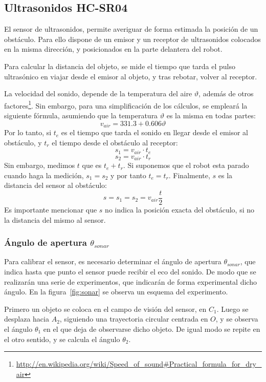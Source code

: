 \documentclass[10pt,a4paper,hidelinks]{article}
\begin{document}
\begin{multicols}{2}
\subsection{Ultrasonidos HC-SR04}

El sensor de ultrasonidos, permite averiguar de forma estimada la posición de un obstáculo. Para ello dispone de un emisor y un receptor de ultrasonidos colocados en la misma dirección, y posicionados en la parte delantera del robot.

Para calcular la distancia del objeto, se mide el tiempo que tarda el pulso ultrasónico en viajar desde el emisor al objeto, y tras rebotar, volver al receptor.

La velocidad del sonido, depende de la temperatura del aire $\vartheta$, además
de otros
factores\footnote{\url{http://en.wikipedia.org/wiki/Speed\_of\_sound\#Practical\_formula\_for\_dry\_air}}.
Sin embargo, para una simplificación de los cálculos, se empleará la siguiente
fórmula, asumiendo que la temperatura $\vartheta$ es la misma en todas partes:
$$ v_{air} = 331.3 + 0.606\vartheta $$
Por lo tanto, si $t_e$ es el tiempo que tarda el sonido en llegar desde el emisor al obstáculo, y $t_r$ el tiempo desde el obstáculo al receptor:
$$ s_1 = v_{air} \cdot t_e $$
$$ s_2 = v_{air} \cdot t_r $$
Sin embargo, medimos $t$ que es $t_e+t_r$. Si suponemos que el robot esta parado cuando haga la medición, $s_1 = s_2$ y por tanto $t_e = t_r$. Finalmente, $s$ es la distancia del sensor al obstáculo:
\begin{equation}
	s = s_1 = s_2 = v_{air}\frac{t}{2}\label{eq:air}
\end{equation}
Es importante mencionar que $s$ no indica la posición exacta del obstáculo, si 
no la distancia del mismo al sensor.

\subsubsection{Ángulo de apertura $\theta_{sonar}$}
Para calibrar el sensor, es necesario determinar el ángulo de apertura 
$\theta_{sonar}$, que indica hasta que punto el sensor puede recibir el eco del 
sonido. De modo que se realizarán una serie de experimentos, que indicarán de 
forma experimental dicho ángulo. En la figura~\ref{fig:sonar} se observa un
esquema del experimento.

Primero un objeto se coloca en el campo de visión del sensor, en $C_1$. Luego se 
desplaza hacia $A_2$, siguiendo una trayectoria circular centrada en $O$, y se 
observa el ángulo $\theta_1$ en el que deja de observarse dicho objeto. De igual 
modo se repite en el otro sentido, y se calcula el ángulo $\theta_{2}$.


\end{multicols}
\end{document}
